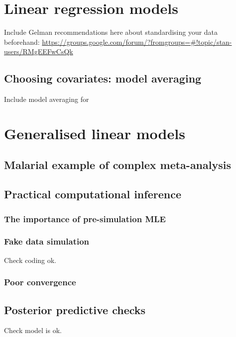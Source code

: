 \documentclass[11pt,fullpage]{book}
\begin{document}
\chapter{Linear regression models}
Include Gelman recommendations here about standardising your data beforehand: \url{https://groups.google.com/forum/?fromgroups=#!topic/stan-users/RMgEEFwCsQk}

\section{Choosing covariates: model averaging}\label{sec:Regression_modelAveraging}
Include model averaging for 

\chapter{Generalised linear models}
\section{Malarial example of complex meta-analysis}
\section{Practical computational inference}
\subsection{The importance of pre-simulation MLE}\label{sec:GLM_preSimMLE}
\subsection{Fake data simulation}
Check coding ok.
\subsection{Poor convergence}\label{sec:GLM_poorConvergence}
\section{Posterior predictive checks}
Check model is ok.






\printindex
\end{document}
